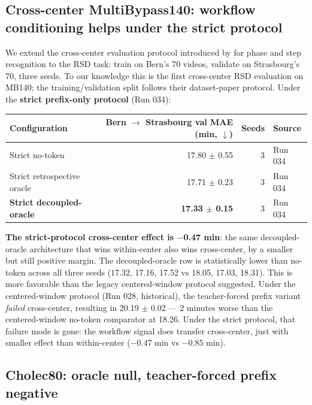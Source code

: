 \subsection{Cross-center MultiBypass140: workflow conditioning helps under the strict
protocol}\label{cross-center-multibypass140-workflow-conditioning-helps-under-the-strict-protocol}

We extend the cross-center evaluation protocol introduced by
\textbf{\citet{lavanchy2024multibypass}} for phase and step recognition to the
RSD task: train on Bern's 70 videos, validate on Strasbourg's 70, three
seeds. To our knowledge this is the first cross-center RSD evaluation on
MB140; the training/validation split follows their dataset-paper
protocol. Under the \textbf{strict prefix-only protocol} (Run 034):

\begin{longtable}[]{@{}lrrl@{}}
\toprule\noalign{}
Configuration & Bern $\rightarrow$ Strasbourg val MAE (min, $\downarrow$) & Seeds & Source \\
\midrule\noalign{}
\endhead
\bottomrule\noalign{}
\endlastfoot
Strict no-token & 17.80 $\pm$ 0.55 & 3 & Run 034 \\
Strict retrospective oracle & 17.71 $\pm$ 0.23 & 3 & Run 034 \\
\textbf{Strict decoupled-oracle} & \textbf{17.33 $\pm$ 0.15} & 3 & Run
034 \\
\end{longtable}

\textbf{The strict-protocol cross-center effect is $-$0.47 min}: the same
decoupled-oracle architecture that wins within-center also wins
cross-center, by a smaller but still positive margin. The
decoupled-oracle row is statistically lower than no-token across all
three seeds (17.32, 17.16, 17.52 vs 18.05, 17.03, 18.31). This is more favorable than the legacy centered-window protocol
suggested. Under the centered-window protocol
(Run 028, historical), the teacher-forced prefix variant \emph{failed}
cross-center, resulting in 20.19 $\pm$ 0.02 --- 2 minutes worse than the
centered-window no-token comparator at 18.26. Under the strict protocol,
that failure mode is gone: the workflow signal does transfer
cross-center, just with smaller effect than within-center ($-$0.47 min vs
$-$0.85 min).

\subsection{Cholec80: oracle null, teacher-forced prefix
negative}\label{cholec80-oracle-null-teacher-forced-prefix-negative}

